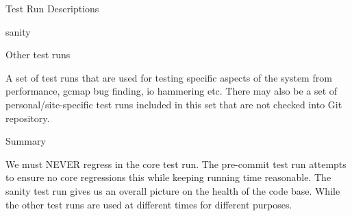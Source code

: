 \begin{section}{Test Run Descriptions}
\begin{subsection}{sanity}
\end{subsection}

\begin{subsection}{Other test runs}

A set of test runs that are used for testing specific aspects of the system from performance, gcmap bug finding, io hammering etc. There may also be a set of personal/site-specific test runs included in this set that are not checked into Git repository.

\end{subsection}

\begin{subsection}{Summary}

We must NEVER regress in the core test run. The pre-commit test run attempts to ensure no core regressions this while keeping running time reasonable. The sanity test run gives us an overall picture on the health of the code base. While the other test runs are used at different times for different purposes.

\end{subsection}

\end{section}
